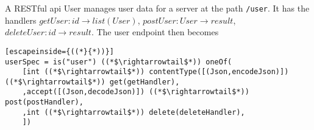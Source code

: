 \begin{exmp}
A RESTful api User manages user data for a server at the path \lstinline{/user}.
It has the handlers $getUser: id \rightarrow list(User)$, $postUser : User
\rightarrow result$, $deleteUser : id \rightarrow result$. The user endpoint
then becomes


\begin{lstlisting}[escapeinside={((*}{*))}]
userSpec = is("user") ((*$\rightarrowtail$*)) oneOf(
    [int ((*$\rightarrowtail$*)) contentType([(Json,encodeJson)]) ((*$\rightarrowtail$*)) get(getHandler),
    ,accept([(Json,decodeJson)]) ((*$\rightarrowtail$*)) post(postHandler),
    ,int ((*$\rightarrowtail$*)) delete(deleteHandler),
    ])
\end{lstlisting}
\end{exmp}





